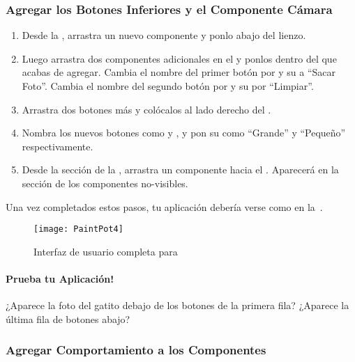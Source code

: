 \subsubsection*{Agregar los Botones Inferiores y el Componente Cámara}

\begin{enumerate}

\item Desde la \palette, arrastra un nuevo componente
   y ponlo abajo del lienzo.

\item Luego arrastra dos componentes  adicionales en
  el \viewer y ponlos dentro del  que
  acabas de agregar. Cambia el nombre del primer botón por
   y su  a ``Sacar
  Foto''. Cambia el nombre del segundo botón por
   y su  por ``Limpiar''.

\item Arrastra dos botones más y colócalos al lado derecho del
  .

\item Nombra los nuevos botones como  y
  , y pon su  como
  ``Grande'' y ``Pequeño'' respectivamente.

\item Desde la sección \media de la \palette, arrastra un componente
   hacia el \viewer. Aparecerá en la sección de los
  componentes no-visibles.

\end{enumerate}
	
Una vez completados estos pasos, tu aplicación debería verse como en
la~.

\begin{figure}[H]
\centering
\texttt{[image: PaintPot4]}
\caption{Interfaz de usuario completa para }
\label{fig:PaintPot4}
\end{figure}

\paragraph{Prueba tu Aplicación!} ¿Aparece la foto del gatito debajo
de los botones de la primera fila? ¿Aparece la última fila de botones abajo?

\subsubsection*{Agregar Comportamiento a los Componentes}

